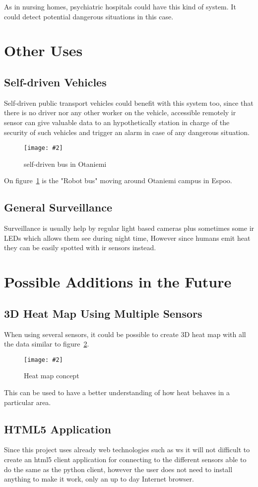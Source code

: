 \documentclass[hidelinks,11pt,a4paper,oneside,article]{memoir}
\newcommand{\putimage}[3][10] %
{
\begin{figure}[h]
	\centering
	\captionsetup{justification=centering}
	\texttt{[image: \#2]}
	\caption{#3}
	\label{fig:#2}
\end{figure}
}
\begin{document}
As in nursing homes, psychiatric hospitals could have this kind of system. It could detect potential dangerous situations in this case.


\section{Other Uses}
\subsection{Self-driven Vehicles}
Self-driven public transport vehicles could benefit with this system too, since that there is no driver nor any other worker on the vehicle, accessible remotely \gls{ir} sensor can give valuable data to an hypothetically station in charge of the security of such vehicles and trigger an alarm in case of any dangerous situation.

    \putimage{robo-bussi}{self-driven bus in Otaniemi}
    
On figure~\ref{fig:robo-bussi} is the "Robot bus" moving around Otaniemi campus in Espoo.

\subsection{General Surveillance}
Surveillance is usually help by regular light based cameras plus sometimes some \gls{ir} LEDs which allows them see during night time, However since humans emit heat they can be easily spotted with \gls{ir} sensors instead.

\section{Possible Additions in the Future}
\subsection*{3D Heat Map Using Multiple Sensors}
When using several sensors, it could be possible to create 3D heat map with all the data similar to figure~\ref{fig:heatmap}.

    \putimage[10]{heatmap}{Heat map concept}
    
This can be used to have a better understanding of how heat behaves in a particular area.

\subsection*{HTML5 Application}
Since this project uses already web technologies such as \gls{ws} it will not difficult to create an \gls{html}5 client application for connecting to the different sensors able to do the same as the python client, however the user does not need to install anything to make it work, only an up to day Internet browser.
\end{document}
